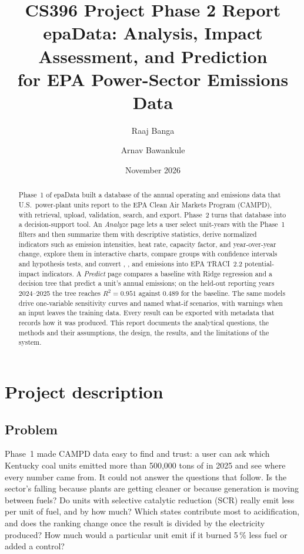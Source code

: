 \documentclass[11pt,a4paper]{article}
\title{%
  \vspace*{-1em}
  {\Large CS396 Project Phase 2 Report}\\[0.8em]
  \textbf{epaData}: Analysis, Impact Assessment, and Prediction\\for EPA Power-Sector Emissions Data}
\author{Raaj Banga \and Arnav Bawankule}
\date{November 2026}
\begin{document}
\maketitle

\begin{abstract}
\noindent
Phase~1 of epaData built a database of the annual operating and emissions data that U.S.\
power-plant units report to the EPA Clean Air Markets Program (CAMPD), with retrieval, upload,
validation, search, and export. Phase~2 turns that database into a decision-support tool. An
\emph{Analyze} page lets a user select unit-years with the Phase~1 filters and then summarize
them with descriptive statistics, derive normalized indicators such as emission intensities,
heat rate, capacity factor, and year-over-year change, explore them in interactive charts,
compare groups with confidence intervals and hypothesis tests, and convert \COtwo{}, \SOtwo{},
and \NOx{} emissions into EPA TRACI~2.2 potential-impact indicators. A \emph{Predict} page
compares a baseline with Ridge regression and a decision tree that predict a unit's annual
\NOx{} emissions; on the held-out reporting years 2024--2025 the tree reaches $R^2 = 0.951$
against $0.489$ for the baseline. The same models drive one-variable sensitivity curves and
named what-if scenarios, with warnings when an input leaves the training data. Every result can
be exported with metadata that records how it was produced. This report documents the
analytical questions, the methods and their assumptions, the design, the results, and the
limitations of the system.
\end{abstract}

\tableofcontents
\newpage

\section{Project description}
\label{sec:description}

\subsection{Problem}

Phase~1 made CAMPD data easy to find and trust: a user can ask which Kentucky coal units emitted
more than 500{,}000 tons of \COtwo{} in 2025 and see where every number came from. It could not
answer the questions that follow. Is the sector's \COtwo{} falling because plants are getting
cleaner or because generation is moving between fuels? Do units with selective catalytic
reduction (SCR) really emit less \NOx{} per unit of fuel, and by how much? Which states
contribute most to acidification, and does the ranking change once the result is divided by
the electricity produced? How much \NOx{} would a particular unit emit if it burned 5\,\% less
fuel or added a control?
\end{document}
